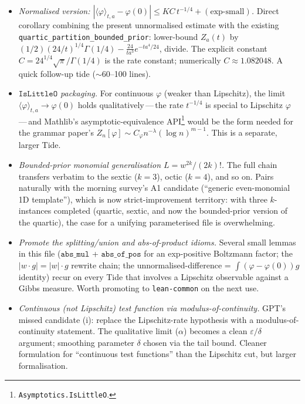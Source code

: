 \documentclass[11pt]{article}
\begin{document}
\begin{itemize}
\item \emph{Normalised version: $|\langle\varphi\rangle_{t,a} - \varphi(0)|
\le KC\,t^{-1/4} + (\text{exp-small})$.} Direct corollary combining the
present unnormalised estimate with the existing
\texttt{quartic\_partition\_bounded\_prior}: lower-bound $Z_a(t)$ by
$(1/2)(24/t)^{1/4}\Gamma(1/4) - \tfrac{24}{ta^3}e^{-ta^4/24}$, divide. The
explicit constant $C = 24^{1/4}\sqrt{\pi}/\Gamma(1/4)$ is the rate
constant; numerically $C \approx 1.082048$. A quick follow-up tide
($\sim$60--100 lines).

\item \emph{$\mathtt{IsLittleO}$ packaging.} For continuous $\varphi$
(weaker than Lipschitz), the limit
$\langle\varphi\rangle_{t,a} \to \varphi(0)$ holds qualitatively\,---\,the
rate $t^{-1/4}$ is special to Lipschitz $\varphi$\,---\,and Mathlib's
asymptotic-equivalence API\footnote{\texttt{Asymptotics.IsLittleO}.} would
be the form needed for the grammar paper's
$Z_n[\varphi] \sim C_\varphi n^{-\lambda} (\log n)^{m-1}$. This is a
separate, larger Tide.

\item \emph{Bounded-prior monomial generalisation $L = w^{2k}/(2k)!$.}
The full chain transfers verbatim to the sextic ($k=3$), octic ($k=4$),
and so on. Pairs naturally with the morning survey's A1 candidate
(``generic even-monomial 1D template''), which is now strict-improvement
territory: with three $k$-instances completed (quartic, sextic, and now
the bounded-prior version of the quartic), the case for a unifying
parameterised file is overwhelming.

\item \emph{Promote the splitting/union and abs-of-product idioms.}
Several small lemmas in this file ($\mathtt{abs\_mul}$ +
$\mathtt{abs\_of\_pos}$ for an exp-positive Boltzmann factor; the
$|w \cdot g| = |w| \cdot g$ rewrite chain; the unnormalised-difference =
$\int (\varphi - \varphi(0)) g$ identity) recur on every Tide that
involves a Lipschitz observable against a Gibbs measure. Worth promoting
to \texttt{lean-common} on the next use.

\item \emph{Continuous (not Lipschitz) test function via
modulus-of-continuity.} GPT's missed candidate (i): replace the
Lipschitz-rate hypothesis with a modulus-of-continuity statement. The
qualitative limit ($\alpha$) becomes a clean $\varepsilon/\delta$
argument; smoothing parameter $\delta$ chosen via the tail bound. Cleaner
formulation for ``continuous test functions'' than the Lipschitz cut, but
larger formalisation.
\end{itemize}
\end{document}
